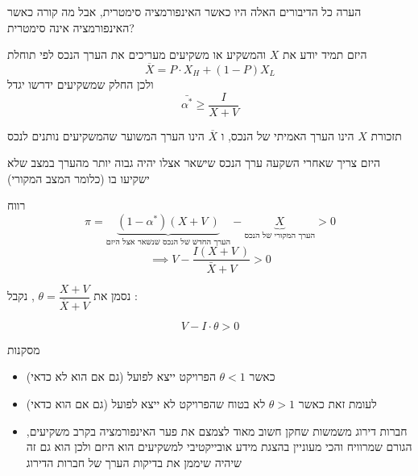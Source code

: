 \documentclass[usenames,dvipsnames]{beamer}
\begin{document}
\begin{RTL}
\begin{frame}[allowframebreaks]
    \framebreak
    \begin{alertblock}{הערה}
    כל הדיבורים האלה היו כאשר האינפורמציה סימטרית, אבל מה קורה כאשר האינפורמציה אינה סימטרית?
        
    \end{alertblock}
   היזם תמיד יודע את $X$ והמשקיע או משקיעים מעריכים את הערך הנכס לפי תוחלת
   $$\overline X = P \cdot X_H + \left(1-P\right) X_L $$
   ולכן החלק שמשקיעים ידרשו יגדל
    $$\bar{\alpha^*} \geq \frac{I}{X+V}$$

    \begin{alertblock}{תזכורת}
        $X$ הינו הערך האמיתי של הנכס, ו $\overline X$ הינו הערך המשוער שהמשקיעים נותנים לנכס
    \end{alertblock}
    \framebreak
    היזם צריך שאחרי השקעה ערך הנכס שישאר אצלו יהיה גבוה יותר מהערך במצב שלא ישקיעו בו (כלומר המצב המקורי)
    \begin{block}{רווח}
        $$\pi = \underbrace{(1-\alpha^*)\left(X +V \ \right)}_{\text{הערך החדש של הנכס שנשאר אצל היזם}} - \underbrace{X}_{\text{הערך המקורי של הנכס}} > 0 $$
        $$ \implies V - \frac{I \left(X + V \ \right)}{\bar X + V} > 0$$

        נסמן את $\theta = \dfrac{X+V}{\overline{X} + V}$ , נקבל :

        $$ V - I \cdot \theta > 0$$ 
    \end{block}
    \framebreak
    \begin{exampleblock}{מסקנות}
    \begin{itemize}
        \item כאשר $\theta < 1$ הפרויקט ייצא לפועל  (גם אם הוא לא כדאי) 
        \item לעומת זאת כאשר $\theta > 1$  לא בטוח שהפרויקט לא ייצא לפועל (גם אם הוא כדאי)
        \item חברות דירוג משמשות שחקן חשוב מאוד לצמצם את פער האינפורמציה בקרב משקיעים, הגורם שמרוויח והכי מעוניין בהצגת מידע אובייקטיבי למשקיעים הוא היזם ולכן הוא גם זה שיהיה שיממן את בדיקות הערך של חברות הדירוג
    \end{itemize}

	
\end{exampleblock}
\end{frame}
\end{RTL}
\end{document}
